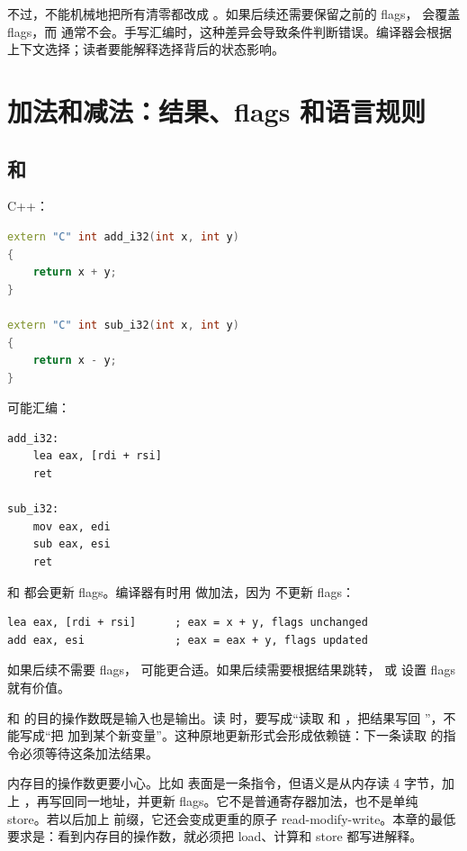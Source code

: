 不过，不能机械地把所有清零都改成 。如果后续还需要保留之前的 flags， 会覆盖 flags，而  通常不会。手写汇编时，这种差异会导致条件判断错误。编译器会根据上下文选择；读者要能解释选择背后的状态影响。

\section{加法和减法：结果、flags 和语言规则}

\subsection{ 和 }

C++：

\begin{lstlisting}[language=C++]
extern "C" int add_i32(int x, int y)
{
    return x + y;
}

extern "C" int sub_i32(int x, int y)
{
    return x - y;
}
\end{lstlisting}

可能汇编：

\begin{lstlisting}
add_i32:
    lea eax, [rdi + rsi]
    ret

sub_i32:
    mov eax, edi
    sub eax, esi
    ret
\end{lstlisting}

 和  都会更新 flags。编译器有时用  做加法，因为  不更新 flags：

\begin{lstlisting}
lea eax, [rdi + rsi]      ; eax = x + y, flags unchanged
add eax, esi              ; eax = eax + y, flags updated
\end{lstlisting}

如果后续不需要 flags， 可能更合适。如果后续需要根据结果跳转， 或  设置 flags 就有价值。

 和  的目的操作数既是输入也是输出。读  时，要写成“读取  和 ，把结果写回 ”，不能写成“把  加到某个新变量”。这种原地更新形式会形成依赖链：下一条读取  的指令必须等待这条加法结果。

内存目的操作数更要小心。比如  表面是一条指令，但语义是从内存读 4 字节，加上 ，再写回同一地址，并更新 flags。它不是普通寄存器加法，也不是单纯 store。若以后加上  前缀，它还会变成更重的原子 read-modify-write。本章的最低要求是：看到内存目的操作数，就必须把 load、计算和 store 都写进解释。

